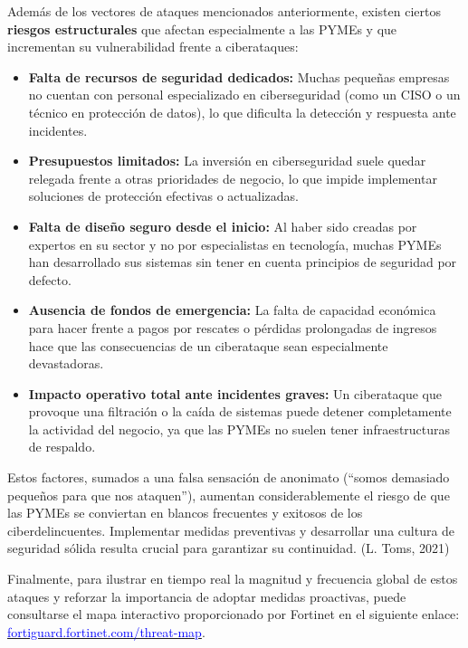 \documentclass[a4paper, 10pt]{article}
\begin{document}
\par\vspace{0.5cm}
Además de los vectores de ataques mencionados anteriormente, existen ciertos \textbf{riesgos estructurales} que afectan especialmente a las PYMEs y que incrementan su vulnerabilidad frente a ciberataques:

\begin{itemize}
  \item \textbf{Falta de recursos de seguridad dedicados:} Muchas pequeñas empresas no cuentan con personal especializado en ciberseguridad (como un CISO o un técnico en protección de datos), lo que dificulta la detección y respuesta ante incidentes.
  \item \textbf{Presupuestos limitados:} La inversión en ciberseguridad suele quedar relegada frente a otras prioridades de negocio, lo que impide implementar soluciones de protección efectivas o actualizadas.
  \item \textbf{Falta de diseño seguro desde el inicio:} Al haber sido creadas por expertos en su sector y no por especialistas en tecnología, muchas PYMEs han desarrollado sus sistemas sin tener en cuenta principios de seguridad por defecto.
  \item \textbf{Ausencia de fondos de emergencia:} La falta de capacidad económica para hacer frente a pagos por rescates o pérdidas prolongadas de ingresos hace que las consecuencias de un ciberataque sean especialmente devastadoras.
  \item \textbf{Impacto operativo total ante incidentes graves:} Un ciberataque que provoque una filtración o la caída de sistemas puede detener completamente la actividad del negocio, ya que las PYMEs no suelen tener infraestructuras de respaldo.
\end{itemize}

\par\vspace{0.5cm}
Estos factores, sumados a una falsa sensación de anonimato (“somos demasiado pequeños para que nos ataquen”), aumentan considerablemente el riesgo de que las PYMEs se conviertan en blancos frecuentes y exitosos de los ciberdelincuentes. 
Implementar medidas preventivas y desarrollar una cultura de seguridad sólida resulta crucial para garantizar su continuidad. (L. Toms, 2021) \cite{toms2021}
\par\vspace{0.5cm}

Finalmente, para ilustrar en tiempo real la magnitud y frecuencia global de estos ataques y reforzar la importancia de adoptar medidas proactivas, puede consultarse el mapa interactivo proporcionado por Fortinet en el siguiente enlace: \href{https://fortiguard.fortinet.com/threat-map}{\textcolor{blue}{fortiguard.fortinet.com/threat-map}}.
\end{document}
